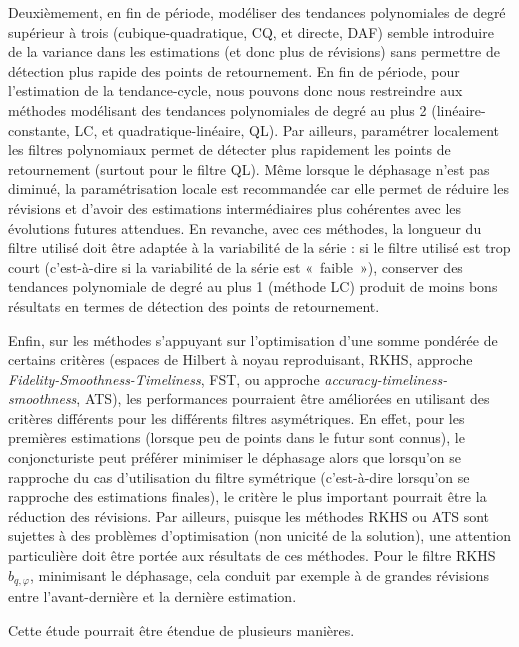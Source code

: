 \documentclass[
  12pt,
  a4paper,french]{article}
\newcommand\1{\mathds{1}}
\begin{document}
Deuxièmement, en fin de période, modéliser des tendances polynomiales de degré supérieur à trois (cubique-quadratique, CQ, et directe, DAF) semble introduire de la variance dans les estimations (et donc plus de révisions) sans permettre de détection plus rapide des points de retournement.
En fin de période, pour l'estimation de la tendance-cycle, nous pouvons donc nous restreindre aux méthodes modélisant des tendances polynomiales de degré au plus 2 (linéaire-constante, LC, et quadratique-linéaire, QL).
Par ailleurs, paramétrer localement les filtres polynomiaux permet de détecter plus rapidement les points de retournement (surtout pour le filtre QL).
Même lorsque le déphasage n'est pas diminué, la paramétrisation locale est recommandée car elle permet de réduire les révisions et d'avoir des estimations intermédiaires plus cohérentes avec les évolutions futures attendues.
En revanche, avec ces méthodes, la longueur du filtre utilisé doit être adaptée à la variabilité de la série : si le filtre utilisé est trop court (c'est-à-dire si la variabilité de la série est «~faible~»), conserver des tendances polynomiale de degré au plus 1 (méthode LC) produit de moins bons résultats en termes de détection des points de retournement.

Enfin, sur les méthodes s'appuyant sur l'optimisation d'une somme pondérée de certains critères (espaces de Hilbert à noyau reproduisant, RKHS, approche \emph{Fidelity-Smoothness-Timeliness}, FST, ou approche \emph{accuracy-timeliness-smoothness}, ATS), les performances pourraient être améliorées en utilisant des critères différents pour les différents filtres asymétriques.
En effet, pour les premières estimations (lorsque peu de points dans le futur sont connus), le conjoncturiste peut préférer minimiser le déphasage alors que lorsqu'on se rapproche du cas d'utilisation du filtre symétrique (c'est-à-dire lorsqu'on se rapproche des estimations finales), le critère le plus important pourrait être la réduction des révisions.
Par ailleurs, puisque les méthodes RKHS ou ATS sont sujettes à des problèmes d'optimisation (non unicité de la solution), une attention particulière doit être portée aux résultats de ces méthodes.
Pour le filtre RKHS \(b_{q,\varphi}\), minimisant le déphasage, cela conduit par exemple à de grandes révisions entre l'avant-dernière et la dernière estimation.

Cette étude pourrait être étendue de plusieurs manières.
\end{document}
